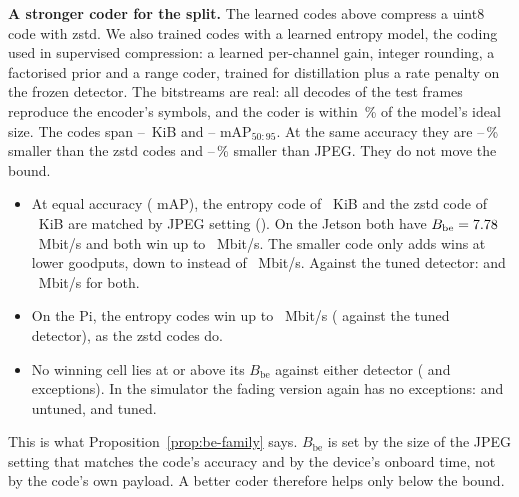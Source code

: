 \textbf{A stronger coder for the split.} The learned codes above compress a uint8 code with zstd. We also trained
\BeEcCodes{} codes with a learned entropy model, the coding used in supervised compression: a learned per-channel
gain, integer rounding, a factorised prior and a range coder, trained for distillation plus a rate penalty on the
frozen detector. The bitstreams are real: all \BeEcDecoded{} decodes of the test frames reproduce the encoder's
symbols, and the coder is within \BeEcOverheadMax\,\% of the model's ideal size. The codes span \BeEcPayMin--\BeEcPayMax~KiB
and \BeEcMapMin--\BeEcMapMax{} mAP$_{50:95}$. At the same accuracy they are \BeEcSaveZstdMin--\BeEcSaveZstdMax\,\%
smaller than the zstd codes and \BeEcSaveJpegMin--\BeEcSaveJpegMax\,\% smaller than JPEG. They do not move the bound.
\begin{itemize}
\item At equal accuracy (\BeEcPairEcMap{} mAP), the entropy code of \BeEcPairEcKib~KiB and the zstd code of
\BeEcPairZsKib~KiB are matched by \BeEcPairSameQstar{} JPEG setting (\BeEcPairQstar). On the Jetson both have
$B_{\mathrm{be}} = 7.78$~Mbit/s and both win up to \BeEcPairEcWin~Mbit/s. The smaller code only adds wins at
lower goodputs, down to \BeEcPairEcMinWin{} instead of \BeEcPairZsMinWin~Mbit/s. Against the tuned detector:
\BeEcTunedPairEcBe{} and \BeEcTunedPairEcWin~Mbit/s for both.
\item On the Pi, the entropy codes win up to \BeEcPiMaxWin~Mbit/s (\BeEcTunedPiMaxWin{} against the tuned detector),
as the zstd codes do.
\item No winning cell lies at or above its $B_{\mathrm{be}}$ against either detector (\BeEcViol{} and
\BeEcTunedViol{} exceptions). In the simulator the fading version again has no exceptions: \BeSimEModFadingExc{} and
\BeSimEVehFadingExc{} untuned, \BeSimETModFadingExc{} and \BeSimETVehFadingExc{} tuned.
\end{itemize}
This is what Proposition~\ref{prop:be-family} says. $B_{\mathrm{be}}$ is set by the size of the JPEG setting that
matches the code's accuracy and by the device's onboard time, not by the code's own payload. A better coder
therefore helps only below the bound.

